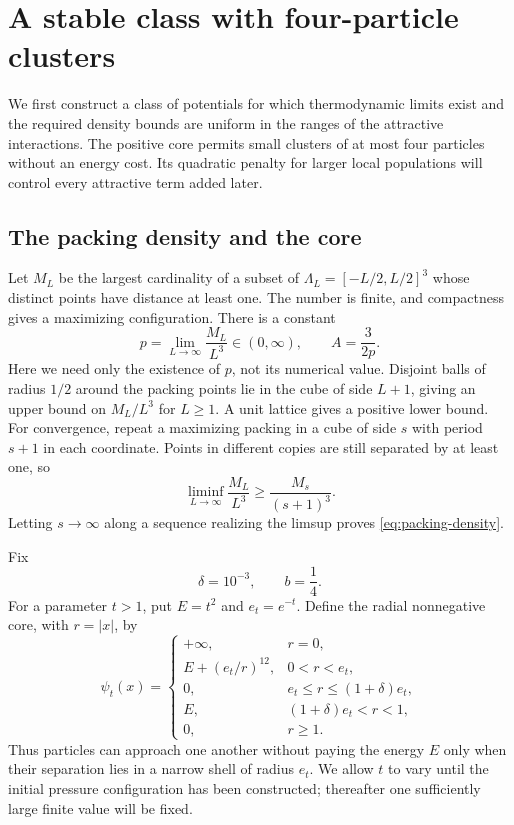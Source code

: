 \section{A stable class with four-particle clusters}
\label{sec:model}

We first construct a class of potentials for which thermodynamic limits
exist and the required density bounds are uniform in the ranges of the
attractive interactions.
The positive core permits small clusters of at most four particles without
an energy cost. Its quadratic penalty for larger local populations will
control every attractive term added later.

\subsection{The packing density and the core}

Let $M_L$ be the largest cardinality of a subset of
$\Lambda_L=[-L/2,L/2]^3$ whose distinct points have distance at least one.
The number is finite, and compactness gives a maximizing configuration.
There is a constant
\begin{equation}
 p=\lim_{L\to\infty}\frac{M_L}{L^3}\in(0,\infty),
 \qquad A=\frac{3}{2p}.
 \label{eq:packing-density}
\end{equation}
Here we need only the existence of $p$, not its numerical value. Disjoint
balls of radius $1/2$ around the packing points lie in the cube of side
$L+1$, giving an upper bound on $M_L/L^3$ for $L\ge1$. A unit lattice
gives a positive lower bound. For convergence, repeat a maximizing packing
in a cube of side $s$ with period $s+1$ in each coordinate. Points in
different copies are still separated by at least one, so
\[
 \liminf_{L\to\infty}\frac{M_L}{L^3}
 \ge \frac{M_s}{(s+1)^3}.
\]
Letting $s\to\infty$ along a sequence realizing the limsup proves
\eqref{eq:packing-density}.

Fix
\[
 \delta=10^{-3},\qquad b=\frac14.
\]
For a parameter $t>1$, put $E=t^2$ and $e_t=e^{-t}$. Define the radial
nonnegative core, with $r=|x|$, by
\begin{equation}
 \psi_t(x)=
 \begin{cases}
 +\infty,&r=0,\\
 E+(e_t/r)^{12},&0<r<e_t,\\
 0,&e_t\le r\le(1+\delta)e_t,\\
 E,&(1+\delta)e_t<r<1,\\
 0,&r\ge1.
 \end{cases}
 \label{eq:core}
\end{equation}
Thus particles can approach one another without paying the energy $E$
only when their separation lies in a narrow shell of radius $e_t$.
We allow $t$ to vary until the initial pressure configuration has been
constructed; thereafter one sufficiently large finite value will be fixed.

